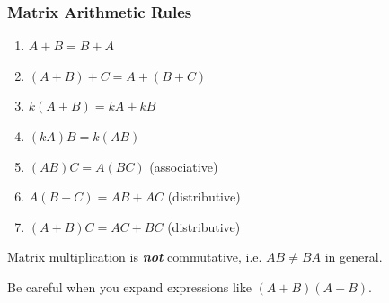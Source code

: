 \documentclass{beamer}
\begin{document}
\begin{frame}
  \frametitle{Matrix Arithmetic Rules}

\begin{enumerate}[i]
	\item $A + B = B + A$
	\item $(A + B) + C = A + (B + C)$ 
	\item $k(A + B) = kA + kB$ 
	\item $(kA)B = k(AB)$
	\item $(AB)C = A(BC)$ (associative)
	\item $A(B+C) = AB + AC$ (distributive)
	\item $(A+B)C = AC + BC$ (distributive)
\end{enumerate}

\begin{Alert}
Matrix multiplication is \emph{\textbf{not}} commutative, i.e. $AB \neq BA$ in general.
\end{Alert}

\begin{center}
\begin{footnotesize}
Be careful when you expand expressions like $(A+B)(A+B)$.
\end{footnotesize}
\end{center}

\end{frame}

\end{document}
